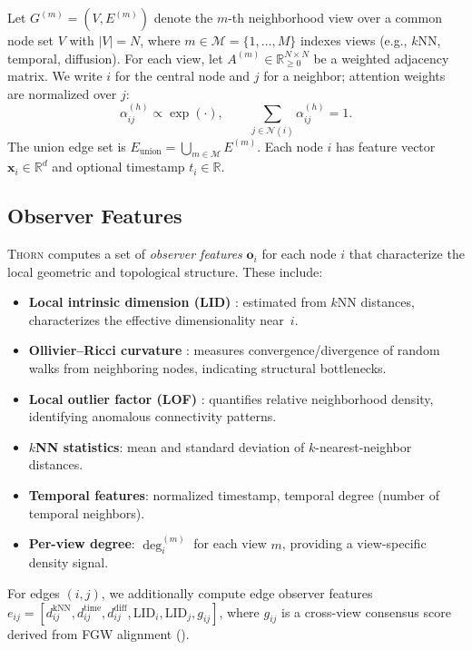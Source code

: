 \documentclass[11pt,a4paper]{article}
\newcommand{\thorn}{\textsc{Thorn}}
\newcommand{\RR}{\mathbb{R}}
\newcommand{\calM}{\mathcal{M}}
\newcommand{\calN}{\mathcal{N}}
\begin{document}
Let $G^{(m)} = (V, E^{(m)})$ denote the $m$-th neighborhood view over a
common node set $V$ with $|V| = N$, where
$m \in \calM = \{1, \ldots, M\}$ indexes views (e.g., $k$NN, temporal,
diffusion).
For each view, let $A^{(m)} \in \RR_{\ge 0}^{N \times N}$ be a weighted
adjacency matrix.
We write $i$ for the central node and $j$ for a neighbor; attention
weights are normalized over $j$:
\begin{equation}
  \alpha_{ij}^{(h)} \propto \exp(\cdot), \qquad
  \sum_{j \in \calN(i)} \alpha_{ij}^{(h)} = 1.
\end{equation}
The union edge set is
$E_{\mathrm{union}} = \bigcup_{m \in \calM} E^{(m)}$.
Each node $i$ has feature vector $\mathbf{x}_i \in \RR^{d}$ and
optional timestamp $t_i \in \RR$.

\subsection{Observer Features}
\label{sec:observers}

\thorn{} computes a set of \emph{observer features} $\mathbf{o}_i$ for
each node $i$ that characterize the local geometric and topological
structure.  These include:

\begin{itemize}[nosep]
  \item \textbf{Local intrinsic dimension (LID)}
    \citep{levina2004maximum}: estimated from $k$NN distances,
    characterizes the effective dimensionality near~$i$.
  \item \textbf{Ollivier--Ricci curvature} \citep{ollivier2009ricci}:
    measures convergence/divergence of random walks from neighboring
    nodes, indicating structural bottlenecks.
  \item \textbf{Local outlier factor (LOF)} \citep{breunig2000lof}:
    quantifies relative neighborhood density, identifying anomalous
    connectivity patterns.
  \item \textbf{$k$NN statistics}: mean and standard deviation of
    $k$-nearest-neighbor distances.
  \item \textbf{Temporal features}: normalized timestamp, temporal
    degree (number of temporal neighbors).
  \item \textbf{Per-view degree}: $\deg_i^{(m)}$ for each view $m$,
    providing a view-specific density signal.
\end{itemize}

For edges $(i, j)$, we additionally compute edge observer features
$e_{ij} = [d_{ij}^{\text{kNN}}, d_{ij}^{\text{time}},
d_{ij}^{\text{diff}}, \mathrm{LID}_i, \mathrm{LID}_j, g_{ij}]$,
where $g_{ij}$ is a cross-view consensus score derived from FGW
alignment ().
\end{document}

